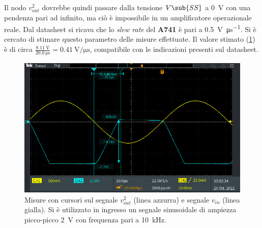 Il nodo $v_{out}^2$ dovrebbe quindi passare dalla tensione $V\sub{SS}$ a \SI{0}{\volt} con una pendenza pari ad infinito, ma ciò è impossibile in un amplificatore operazionale reale. Dal datasheet si ricava che lo \textit{slew rate} del \textbf{\textmu A741} è pari a \SI{0.5}{\volt\per\micro\second}. Si è cercato di stimare questo parametro delle misure effettuate. Il valore stimato (\Fig\ref{fig:slew_rate_circuito_1}) è di circa $\frac{\SI{8.11}{\volt}}{\SI{20.0}{\micro\second}}=\SI{0.41}{\volt\per\micro\second}$, compatibile con le indicazioni presenti sul datasheet.
\begin{figure}[h]
	\centering
	\includegraphics[width=\linewidth]{./ImageFiles/Laboratorio 3/TEK00006.PNG}
	\caption{Misure con cursori sul segnale $v_{out}^2$ (linea azzurra) e segnale $v_{in}$ (linea gialla). Si è utilizzato in ingresso un segnale sinusoidale di ampiezza picco-picco \SI{2}{\volt} con frequenza pari a \SI{10}{\kilo\hertz}.}
	\label{fig:slew_rate_circuito_1}
\end{figure}


